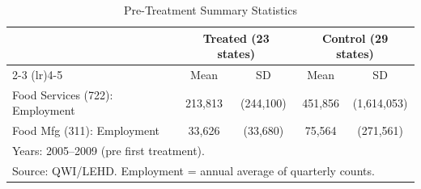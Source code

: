 \begin{table}[t]
\centering
\caption{Pre-Treatment Summary Statistics}
\label{tab:summary}
\begin{tabular}{lcccc}
\toprule
 & \multicolumn{2}{c}{Treated (23 states)} & \multicolumn{2}{c}{Control (29 states)} \\
\cmidrule(lr){2-3} \cmidrule(lr){4-5}
 & Mean & SD & Mean & SD \\
\midrule
Food Services (722): Employment & 213,813 & (244,100) & 451,856 & (1,614,053) \\
Food Mfg (311): Employment & 33,626 & (33,680) & 75,564 & (271,561) \\
\midrule
\multicolumn{5}{l}{\footnotesize Years: 2005--2009 (pre first treatment).} \\
\multicolumn{5}{l}{\footnotesize Source: QWI/LEHD. Employment = annual average of quarterly counts.} \\
\bottomrule
\end{tabular}
\end{table}

